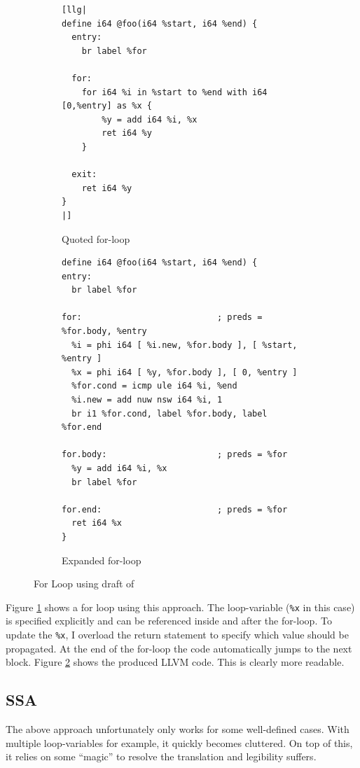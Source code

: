 \documentclass[a4paper,bibliography=totocnumbered,parskip,headsepline]{scrbook}
\begin{document}
\begin{figure}
\begin{subfigure}{\textwidth}
\begin{lstlisting}
[llg|
define i64 @foo(i64 %start, i64 %end) {
  entry:
    br label %for

  for:
    for i64 %i in %start to %end with i64 [0,%entry] as %x {
        %y = add i64 %i, %x
        ret i64 %y
    }

  exit:
    ret i64 %y
}
|]
\end{lstlisting}
\caption{Quoted for-loop}
\label{fig:forquote1}
\end{subfigure}

\begin{subfigure}{\textwidth}
\begin{lstlisting}
define i64 @foo(i64 %start, i64 %end) {
entry:
  br label %for

for:                           ; preds = %for.body, %entry
  %i = phi i64 [ %i.new, %for.body ], [ %start, %entry ]
  %x = phi i64 [ %y, %for.body ], [ 0, %entry ]
  %for.cond = icmp ule i64 %i, %end
  %i.new = add nuw nsw i64 %i, 1
  br i1 %for.cond, label %for.body, label %for.end

for.body:                      ; preds = %for
  %y = add i64 %i, %x
  br label %for

for.end:                       ; preds = %for
  ret i64 %x
}
\end{lstlisting}
\caption{Expanded for-loop}
\label{fig:forquote2}
\end{subfigure}
\caption{For Loop using draft of }
\label{fig:forquote}
\end{figure}

Figure \ref{fig:forquote1} shows a for loop using this approach.
The loop-variable (\lstinline!%x! in this case) is specified explicitly and can be referenced inside and after the for-loop.
To update the \lstinline!%x!, I overload the return statement to specify which value should be propagated.
At the end of the for-loop the code automatically jumps to the next block.
Figure \ref{fig:forquote2} shows the produced LLVM code.
This is clearly more readable.

\subsection{SSA}
The above approach unfortunately only works for some well-defined cases.
With multiple loop-variables for example, it quickly becomes cluttered.
On top of this, it relies on some ``magic'' to resolve the translation and legibility suffers.
\end{document}
